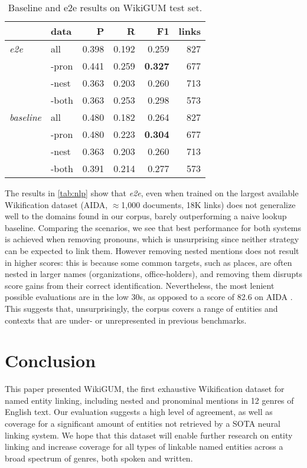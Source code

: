 \documentclass[11pt,a4paper]{article}
\begin{document}
\begin{table}[h!bt]
\normalsize
\begin{tabular}{llrrrr}
\hline
 & data & P & R & F1 & links \\
\hline
\textit{e2e} & all & 0.398 & 0.192 & 0.259 & 827  \\
 & -pron & 0.441 & 0.259 & \textbf{0.327} & 677  \\
 & -nest & 0.363 & 0.203 & 0.260 & 713  \\
 & -both & 0.363 & 0.253 & 0.298 & 573  \\
 \hline
\textit{baseline} & all & 0.480 & 0.182 & 0.264 & 827  \\
 & -pron & 0.480 & 0.223 & \textbf{0.304} & 677 \\
 & -nest & 0.363 & 0.203 & 0.260 & 713 \\ 
 & -both & 0.391 & 0.214 & 0.277 & 573
\\ \hline 
\end{tabular}
 \caption{Baseline and e2e results on WikiGUM test set.}
\end{table}\label{tab:nlp}

The results in \ref{tab:nlp} show that \textit{e2e}, even when trained on the largest available Wikification dataset (AIDA, $\approx$1,000 documents, 18K links) does not generalize well to the domains found in our corpus, barely outperforming a naive lookup baseline. Comparing the scenarios, we see that best performance for both systems is achieved when removing pronouns, which is unsurprising since neither strategy can be expected to link them. However removing nested mentions does not result in higher scores: this is because some common targets, such as places, are often nested in larger names (organizations, office-holders), and removing them disrupts score gains from their correct identification. Nevertheless, the most lenient possible evaluations are in the low 30s, as opposed to a score of 82.6 on AIDA \cite[524]{kolitsas-etal-2018-end}. This suggests that, unsurprisingly, the corpus covers a range of entities and contexts that are under- or unrepresented in previous benchmarks.

\section{Conclusion}

This paper presented WikiGUM, the first exhaustive Wikification dataset for named entity linking, including nested and pronominal mentions in 12 genres of English text. Our evaluation suggests a high level of agreement, as well as coverage for a significant amount of entities not retrieved by a SOTA neural linking system. We hope that this dataset will enable further research on entity linking and increase coverage for all types of linkable named entities across a broad spectrum of genres, both spoken and written.



\end{document}
